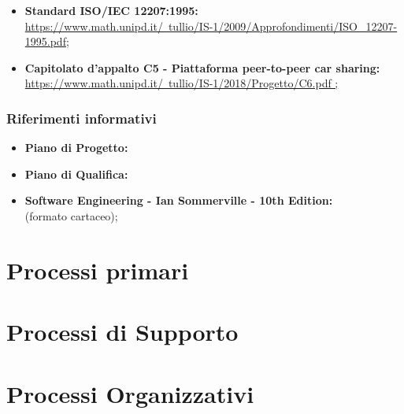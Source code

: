 \documentclass[a4paper]{article}
\begin{document}
\begin{itemize}
	\item  \textbf{Standard ISO/IEC 12207:1995: \\}\href{https://www.math.unipd.it/~tullio/IS-1/2009/Approfondimenti/ISO_12207-1995.
pdf}{https://www.math.unipd.it/~tullio/IS-1/2009/Approfondimenti/ISO_12207-1995.pdf;}
	\item \textbf{Capitolato d'appalto C5 - Piattaforma peer-to-peer car sharing:  \\}\href{https://www.math.unipd.it/~tullio/IS- 1/2018/Progetto/C6.pdf}{https://www.math.unipd.it/~tullio/IS-1/2018/Progetto/C6.pdf
;}
\end{itemize}
\subsubsection{Riferimenti informativi}
\begin{itemize}
	\item \textbf{Piano di Progetto:}
	\item \textbf{Piano di Qualifica:}
	\item \textbf{Software Engineering - Ian Sommerville - 10th Edition: \\}(formato cartaceo);
\end{itemize}
\section{Processi primari}
\section{Processi di Supporto}
\section{Processi Organizzativi}
\end{document}
